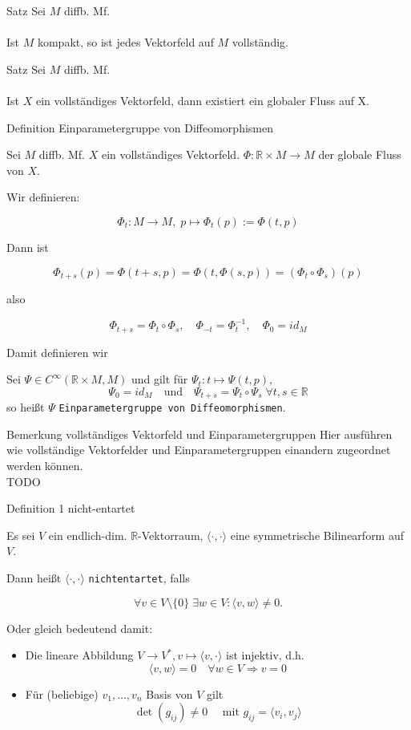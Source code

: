 \documentclass[a6paper,11pt,grid=front]{kartei}
\newcommand{\fl}[1]{\begin{flushleft}
 #1 \end{flushleft}}
\newcommand{\R}{\mathbb{R}}
\newcommand{\blf}[1]{\langle #1 \rangle}
\newcounter{def}
\begin{document}
\nonameyet
{Satz} {}
{
Sei $M$ diffb. Mf.
\\
~\\
Ist $M$ kompakt, so ist jedes Vektorfeld auf $M$ vollständig.
}
{}

\nonameyet
{Satz} {}
{
Sei $M$ diffb. Mf.
\\
~\\
Ist $X$ ein vollständiges Vektorfeld, dann existiert ein globaler Fluss
auf X.
}
{}

\nonameyet
{Definition} {\small Einparametergruppe von Diffeomorphismen}
{
\tiny
Sei $M$ diffb. Mf. $X$ ein vollständiges Vektorfeld. 
$\Phi: \R \times M \to M$ der globale Fluss von $X$. 
\scriptsize
%
\fl{Wir definieren:}
\vspace{-1em}
\[
\Phi_t : M \to M, \; p \mapsto \Phi_t(p) := \Phi(t,p)
\]
%
\fl{Dann ist}
\vspace{-1em}
\[
\Phi_{t+s}(p) = \Phi(t+s,p) = \Phi(t,\Phi(s,p)) = (\Phi_t \circ \Phi_s)(p)
\]
%
\fl{also}
\vspace{-1em}
\[
\Phi_{t+s} = \Phi_t \circ \Phi_s 
,\quad 
\Phi_{-t} = \Phi^{-1}_t
, \quad 
\Phi_0 = id_M
\]
\fl{Damit definieren wir}
%
\small
Sei $\Psi \in C^\infty(\R \times M, M)$ und gilt für 
$\Psi_t: t\mapsto \Psi(t,p)$, 
\[
\Psi_0 = id_M 
\quad \text{und} \quad
\Psi_{t+s} = \Psi_t\circ \Psi_s \; \forall t,s \in \R
\]
%
so heißt $\Psi$ \texttt{Einparametergruppe von 
Diffeomorphismen}.
}
{}

\nonameyet
{\tiny Bemerkung} {\tiny vollständiges Vektorfeld und Einparametergruppen}
{
Hier ausführen wie vollständige Vektorfelder und Einparametergruppen
einandern zugeordnet werden können.
\\
TODO
}
{}


\nonameyet
{Definition 1} {nicht-entartet}
{
	\small
Es sei $V$ ein endlich-dim. $\R$-Vektorraum, $\blf{\cdot,\cdot}$ eine 
symmetrische Bilinearform auf $V$.
\fl{Dann heißt $\blf{\cdot,\cdot}$ \texttt{nichtentartet}, falls}
\[
\forall v\in V\setminus\{0\} \; \exists w\in V: \blf{v,w} \neq 0.
\]
\fl{Oder gleich bedeutend damit:}
\begin{itemize}[-]
\item%
Die lineare Abbildung $V \to V^*, v \mapsto \blf{v,\cdot}$ ist injektiv, d.h.
\[
\blf{v,w} = 0 \quad \forall w\in V \Rightarrow v = 0
\] 
\item%
Für (beliebige) $v_1,\dots,v_n$ Basis von $V$ gilt
\[
\det(g_{ij}) \neq 0 \quad \text{ mit } g_{ij} = \blf{v_i,v_j} 
\]
\end{itemize}
}
{}
\end{document}
